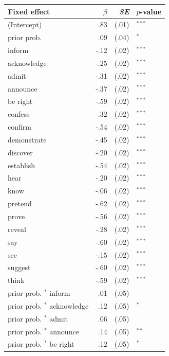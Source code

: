 \documentclass[11pt,fleqn]{article}
\newcommand{\6}{\mbox{$[\hspace*{-.6mm}[$}}
\newcommand{\9}{\mbox{$]\hspace*{-.6mm}]$}}
\begin{document}
\begin{table}
\begin{center}
\begin{tabular}{l r r l}
\toprule
Fixed effect & $\beta$ & {\em SE} & $p$-value \\ 
\midrule
(Intercept)                      &.83 & (.01) & $^{***}$  \\
prior prob.                           &.09 & (.04) & $^{*}$    \\
\midrule
inform             &-.12 & (.02) & $^{***}$ \\
acknowledge        &-.25 & (.02) & $^{***}$ \\
admit              &-.31 & (.02) & $^{***}$ \\
announce           &-.37 & (.02) & $^{***}$ \\
be right           &-.59 & (.02) & $^{***}$ \\
confess            &-.32 & (.02) & $^{***}$ \\
confirm            &-.54 & (.02) & $^{***}$ \\
demonstrate        &-.45 & (.02) & $^{***}$ \\
discover           &-.20 & (.02) & $^{***}$ \\
establish          &-.54 & (.02) & $^{***}$ \\
hear               &-.20 & (.02) & $^{***}$ \\
know               &-.06 & (.02) & $^{***}$ \\
pretend            &-.62 & (.02) & $^{***}$ \\
prove              &-.56 & (.02) & $^{***}$ \\
reveal             &-.28 & (.02) & $^{***}$ \\
say                &-.60 & (.02) & $^{***}$ \\
see                &-.15 & (.02) & $^{***}$ \\
suggest            &-.60 & (.02) & $^{***}$ \\
think              &-.59 & (.02) & $^{***}$ \\
\midrule
prior prob. $^*$ inform      &.01 & (.05)     \\
prior prob. $^*$ acknowledge &.12 & (.05) & $^{*}$    \\
prior prob. $^*$ admit       &.06 & (.05)     \\
prior prob. $^*$ announce    &.14 & (.05) & $^{**}$   \\
prior prob. $^*$ be right    &.12 & (.05) & $^{*}$    \\

\end{tabular}
\end{center}
\end{table}
\end{document}
